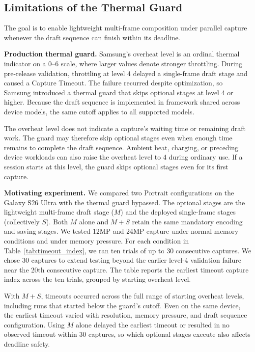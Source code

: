 \subsection{Limitations of the Thermal Guard}
\label{sec:guard-limit}
The goal is to enable lightweight multi-frame composition under parallel capture whenever the draft sequence can finish within its deadline.

\smallskip\noindent\textbf{Production thermal guard.}
Samsung's overheat level is an ordinal thermal indicator on a 0--6 scale, where larger values denote stronger throttling.
During pre-release validation, throttling at level 4 delayed a single-frame draft stage and caused a Capture Timeout.
The failure recurred despite optimization, so Samsung introduced a thermal guard that skips optional stages at level 4 or higher.
Because the draft sequence is implemented in framework shared across device models, the same cutoff applies to all supported models.

The overheat level does not indicate a capture's waiting time or remaining draft work.
The guard may therefore skip optional stages even when enough time remains to complete the draft sequence.
Ambient heat, charging, or preceding device workloads can also raise the overheat level to 4 during ordinary use.
If a session starts at this level, the guard skips optional stages even for its first capture.

\smallskip\noindent\textbf{Motivating experiment.}
We compared two Portrait configurations on the Galaxy S26 Ultra with the thermal guard bypassed.
The optional stages are the lightweight multi-frame draft stage (\(M\)) and the deployed single-frame stages (collectively \(S\)).
Both \(M\) alone and \(M+S\) retain the same mandatory encoding and saving stages.
We tested 12MP and 24MP capture under normal memory conditions and under memory pressure.
For each condition in Table~\ref{tab:timeout_index}, we ran ten trials of up to 30 consecutive captures.
We chose 30 captures to extend testing beyond the earlier level-4 validation failure near the 20th consecutive capture.
The table reports the earliest timeout capture index across the ten trials, grouped by starting overheat level.



With \(M+S\), timeouts occurred across the full range of starting overheat levels, including runs that started below the guard's cutoff.
Even on the same device, the earliest timeout varied with resolution, memory pressure, and draft sequence configuration.
Using \(M\) alone delayed the earliest timeout or resulted in no observed timeout within 30 captures, so which optional stages execute also affects deadline safety.

